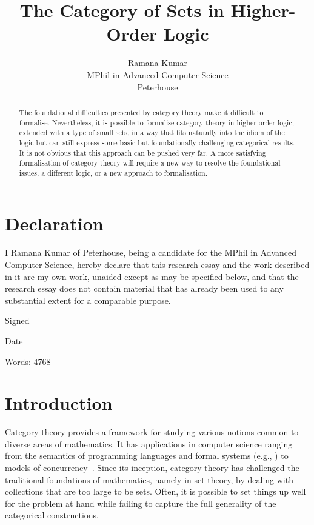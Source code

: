 \documentclass[twoside,titlepage,11pt]{article}
\title{The Category of Sets in Higher-Order Logic}
\author{Ramana Kumar\\MPhil in Advanced Computer Science\\Peterhouse}
\begin{document}
\maketitle
\section*{Declaration}%
\thispagestyle{empty}
I Ramana Kumar of Peterhouse, being a candidate for the MPhil in Advanced Computer Science, hereby declare that this research essay and the work described in it are my own work, unaided except as may be specified below, and that the research essay does not contain material that has already been used to any substantial extent for a comparable purpose.

\vspace{1em}
\noindent Signed

\vspace{1em}
\noindent Date

\vspace{2em}
\noindent Words: 4768
\begin{abstract}%
The foundational difficulties presented by category theory make it difficult to formalise.
Nevertheless, it is possible to formalise category theory in higher-order logic, extended with a type of small sets, in a way that fits naturally into the idiom of the logic but can still express some basic but foundationally-challenging categorical results.
It is not obvious that this approach can be pushed very far.
A more satisfying formalisation of category theory will require a new way to resolve the foundational issues, a different logic, or a new approach to formalisation.
\end{abstract}%
\section{Introduction}%
Category theory provides a framework for studying various notions common to diverse areas of mathematics.
It has applications in computer science ranging from the semantics of programming languages and formal systems (e.g., \cite{CroleCT,JacobsCLTT}) to models of concurrency~\cite{DBLP:conf/csl/CattaniW96}.
Since its inception, category theory has challenged the traditional foundations of mathematics, namely in set theory, by dealing with collections that are too large to be sets. 
Often, it is possible to set things up well for the problem at hand while failing to capture the full generality of the categorical constructions.
\end{document}

